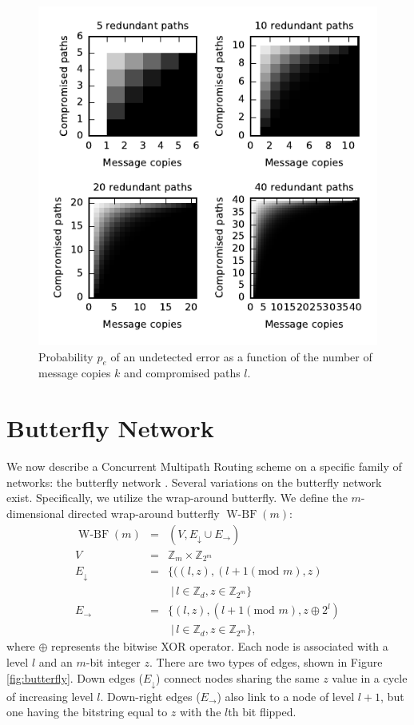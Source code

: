 \documentclass[twocolumn]{article}
\newcommand{\beq}{\begin{eqnarray}}
\newcommand{\eeq}{\end{eqnarray}}
\DeclareMathOperator{\wbf}{W-BF}
\begin{document}
\begin{figure}
\includegraphics{fig-perror.pdf}
\caption{
Probability $p_e$ of an undetected error as a function of the number of message
copies $k$ and compromised paths $l$.
\label{fig:perror}
}
\end{figure}

\section{Butterfly Network}

We now describe a Concurrent Multipath Routing scheme on a specific family
of networks: the butterfly network \cite{}.
Several variations on the butterfly network exist.
Specifically, we utilize the wrap-around butterfly.
We define the $m$-dimensional directed wrap-around butterfly $\wbf(m)$:
\beq
\wbf(m) &=& (V, E_\downarrow \cup E_\rightarrow) \\
V &=& \mathbb{Z}_m \times \mathbb{Z}_{2^m} \\
E_\downarrow &=& \{((l,z),(l+1 (\text{mod } m),z) \nonumber \\
&& \; | \, l \in \mathbb{Z}_d, z \in \mathbb{Z}_{2^m}\} \\
E_\rightarrow &=& \{(l,z),(l+1 (\text{mod } m), z \oplus 2^l) \nonumber \\
&& \; | \, l \in \mathbb{Z}_d, z \in \mathbb{Z}_{2^m}\},
\eeq
where $\oplus$ represents the bitwise XOR operator.
Each node is associated with a level $l$ and an $m$-bit integer $z$.
There are two types of edges, shown in Figure \ref{fig:butterfly}.
Down edges ($E_\downarrow$) connect nodes sharing the same $z$ value
in a cycle of increasing level $l$.
Down-right edges ($E_\rightarrow$) also link to a node of level $l + 1$,
but one having the bitstring equal to $z$ with the $l$th bit flipped.
\end{document}
